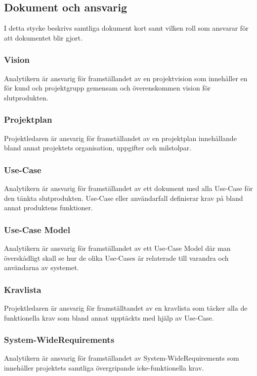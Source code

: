 \subsection{Dokument och ansvarig}
I detta stycke beskrivs samtliga dokument kort samt vilken roll som ansvarar för att dokumentet blir gjort.

\subsubsection{Vision}
Analytikern är ansvarig för framställandet av en projektvision som innehåller en för kund och projektgrupp gemensam och överenskommen vision för slutprodukten.

\subsubsection{Projektplan}
Projektledaren är ansvarig för framställandet av en projektplan innehållande bland annat projektets organisation, uppgifter och milstolpar.

\subsubsection{Use-Case}
Analytikern är ansvarig för framställandet av ett dokument med alla Use-Case för den tänkta slutprodukten. Use-Case eller användarfall definierar krav på bland annat produktens funktioner.

\subsubsection{Use-Case Model}
Analytikern är ansvarig för framställandet av ett Use-Case Model där man överskådligt skall se hur de olika Use-Cases är relaterade till varandra och användarna av systemet.

\subsubsection{Kravlista}
Projektledaren är ansvarig för framställtandet av en kravlista som täcker alla de funktionella krav som bland annat upptäckts med hjälp av Use-Case.

\subsubsection{System-WideRequirements}
Analytikern är ansvarig för framställandet av System-WideRequirements som innehåller projektets samtliga övergripande icke-funktionella krav.

